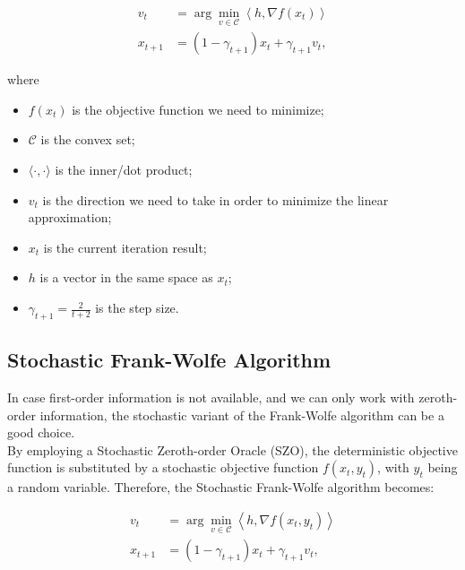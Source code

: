 \documentclass[10pt,twocolumn,letterpaper]{article}
\begin{document}
\[
\begin{aligned}
v_{t} & =\arg \min _{v \in \mathcal{C}}\left\langle h, \nabla f\left(x_{t}\right)\right\rangle \\
x_{t+1} & =\left(1-\gamma_{t+1}\right) x_{t}+\gamma_{t+1} v_{t},
\end{aligned}
\]

where 

\begin{itemize}

   \item $f\left(x_{t}\right)$ is the objective function we need to minimize;

   \item $\mathcal{C}$ is the convex set;

   \item $\langle\cdot, \cdot\rangle$ is the inner/dot product;

   \item $v_{t}$ is the direction we need to take in order to minimize the linear approximation;

   \item $x_{t}$ is the current iteration result;

   \item $h$ is a vector in the same space as $x_{t}$;

   \item $\gamma_{t+1}=\frac{2}{t+2}$ is the step size.

\end{itemize}

\subsection{Stochastic Frank-Wolfe Algorithm}

In case first-order information is not available, and we can only work with zeroth-order information,
the stochastic variant of the Frank-Wolfe algorithm can be a good choice. \\

By employing a Stochastic Zeroth-order Oracle (SZO), the deterministic objective function is substituted by a 
stochastic objective function $f\left(x_{t}, y_{t}\right)$, with  $y_{t}$ being a random variable.
Therefore, the Stochastic Frank-Wolfe algorithm becomes:

\[
\begin{aligned}
v_{t} & =\arg \min _{v \in \mathcal{C}}\left\langle h, \nabla f\left(x_{t}, y_{t}\right)\right\rangle \\
x_{t+1} & =\left(1-\gamma_{t+1}\right) x_{t}+\gamma_{t+1} v_{t},
\end{aligned}
\]
\end{document}
